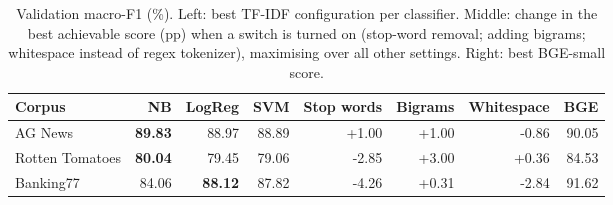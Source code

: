 \begin{table}[H]
\centering
\footnotesize
\caption{Validation macro-F1 (\%). Left: best TF-IDF configuration per classifier. Middle: change in the best achievable score (pp) when a switch is turned on (stop-word removal; adding bigrams; whitespace instead of regex tokenizer), maximising over all other settings. Right: best BGE-small score.}\label{tab:validation}
\begin{tabular}{@{}lrrrrrrr@{}}
\toprule
Corpus & NB & LogReg & SVM & Stop words & Bigrams & Whitespace & BGE \\
\midrule
AG News & \textbf{89.83} & 88.97 & 88.89 & +1.00 & +1.00 & -0.86 & 90.05 \\
Rotten Tomatoes & \textbf{80.04} & 79.45 & 79.06 & -2.85 & +3.00 & +0.36 & 84.53 \\
Banking77 & 84.06 & \textbf{88.12} & 87.82 & -4.26 & +0.31 & -2.84 & 91.62 \\
\bottomrule
\end{tabular}
\end{table}
